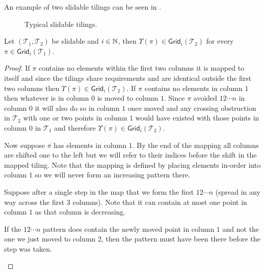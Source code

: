 \begin{definition}
\begin{itemize}
\end{itemize}
\end{definition}

An example of two slidable tilings can be seen in .

\begin{figure}[ht]
    \centering
    
    \caption{Typical slidable tilings.}
    \label{fig:slidable_tilings}
\end{figure}

\begin{lemma}\label{lem:slidemap}
Let $(\mathcal{T}_1,\mathcal{T}_2)$ be slidable and $i \in \mathbb{N}$, then $\Upsilon(\pi) \in \textsf{Grid}_i(\mathcal{T}_2)$ for every $\pi \in \textsf{Grid}_i(\mathcal{T}_1)$.
\end{lemma}
\begin{proof}
If $\pi$ contains no elements within the first two columns it is mapped to itself and since the tilings share requirements and are identical outside the first two columns then $\Upsilon(\pi) \in \textsf{Grid}_i(\mathcal{T}_2)$. If $\pi$ contains no elements in column $1$ then whatever is in column $0$ is moved to column $1$. Since $\pi$ avoided $12\dotsm n$ in column $0$ it will also do so in column $1$ once moved and any crossing obstruction in $\mathcal{T}_2$ with one or two points in column $1$ would have existed with those points in column $0$ in $\mathcal{T}_1$ and therefore $\Upsilon(\pi) \in \textsf{Grid}_i(\mathcal{T}_2)$.

Now suppose $\pi$ has elements in column $1$. By the end of the mapping all columns are shifted one to the left but we will refer to their indices before the shift in the mapped tiling. Note that the mapping is defined by placing elements in-order into column $1$ so we will never form an increasing pattern there. 

Suppose after a single step in the map that we form the first $12\cdots n$ (spread in any way across the first $3$ columns). Note that it can contain at most one point in column $1$ as that column is decreasing.

If the $12\cdots n$ pattern does contain the newly moved point in column $1$ and not the one we just moved to column $2$, then the pattern must have been there before the step was taken.

\begin{center}

\end{center}


\end{proof}
